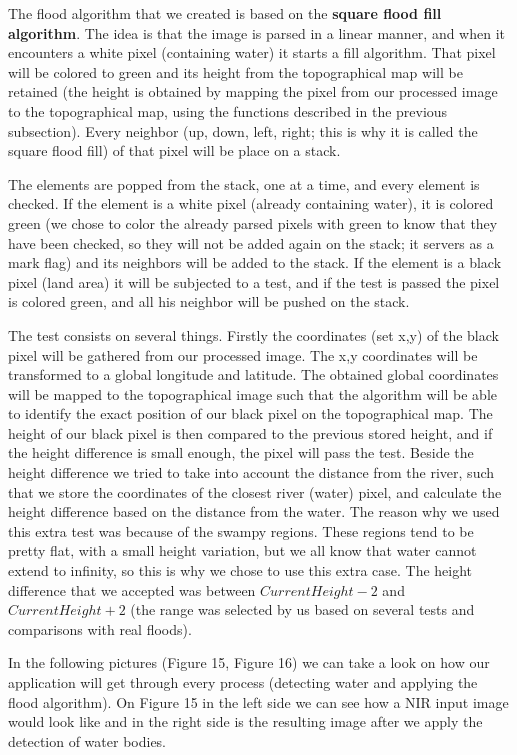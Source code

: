 \documentclass[12pt, a4paper]{report}
\begin{document}
The flood algorithm that we created is based on the \textbf{square flood fill algorithm}. The idea is that the image is parsed in a linear manner, and when it encounters a white pixel (containing water) it starts a fill algorithm. That pixel will be colored to green and its height from the topographical map will be retained (the height is obtained by mapping the pixel from our processed image to the topographical map, using the functions described in the previous subsection). Every neighbor (up, down, left, right; this is why it is called the square flood fill) of that pixel will be place on a stack. \par 
The elements are popped from the stack, one at a time, and every element is checked. If the element is a white pixel (already containing water), it is colored green (we chose to color the already parsed pixels with green to know that they have been checked, so they will not be added again on the stack; it servers as a mark flag) and its neighbors will be added to the stack. If the element is a black pixel (land area) it will be subjected to a test, and if the test is passed the pixel is colored green, and all his neighbor will be pushed on the stack. 
\par 
The test consists on several things. Firstly the coordinates (set x,y) of the black pixel will be gathered from our processed image. The x,y coordinates will be transformed to a global longitude and latitude. The obtained global coordinates will be mapped to the topographical image such that the algorithm will be able to identify the exact position of our black pixel on the topographical map. The height of our black pixel is then compared to the previous stored height, and if the height difference is small enough, the pixel will pass the test. Beside the height difference we tried to take into account the distance from the river, such that we store the coordinates of the closest river (water) pixel, and calculate the height difference based on the distance from the water. The reason why we used this extra test was because of the swampy regions. These regions tend to be pretty flat, with a small height variation, but we all know that water cannot extend to infinity, so this is why we chose to use this extra case. The height difference that we accepted was between \textbf{$CurrentHeight - 2$} and \textbf{$CurrentHeight + 2$} (the range was selected by us based on several tests and comparisons with real floods).
\par 
In the following pictures (Figure 15, Figure 16) we can take a look on how our application will get through every process (detecting water and applying the flood algorithm). On Figure 15 in the left side we can see how a NIR input image would look like and in the right side is the resulting image after we apply the detection of water bodies.
\end{document}
